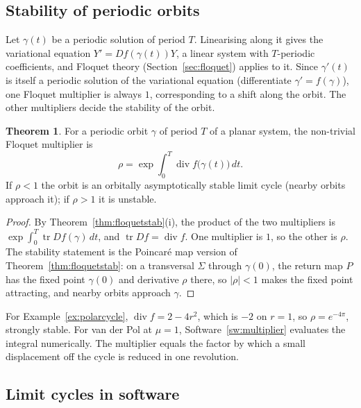\documentclass[11pt,a4paper]{article}
\numberwithin{equation}{section}
\DeclareMathOperator{\tr}{tr}
\theoremstyle{definition}
\newtheorem{thm}{Theorem}[subsection]
\begin{document}
\subsection{Stability of periodic orbits}
\label{ssec:orbitstab}

Let $\gamma(t)$ be a periodic solution of period $T$. Linearising along it gives the variational equation $Y' = Df(\gamma(t))Y$, a linear system with $T$-periodic coefficients, and Floquet theory
(Section~\ref{sec:floquet}) applies to it. Since $\gamma'(t)$ is itself a periodic solution of the variational equation (differentiate $\gamma' = f(\gamma)$), one Floquet multiplier is always $1$, corresponding
to a shift along the orbit. The other multipliers decide the stability of the orbit.

\begin{thm}
\label{thm:cyclestab}
For a periodic orbit $\gamma$ of period $T$ of a planar system, the non-trivial Floquet multiplier is
\[
\rho = \exp\int_0^T\operatorname{div}f\bigl(\gamma(t)\bigr)\,dt .
\]
If $\rho < 1$ the orbit is an orbitally asymptotically stable limit cycle (nearby orbits approach it); if $\rho > 1$ it is unstable.
\end{thm}

\begin{proof}
By Theorem~\ref{thm:floquetstab}(i), the product of the two multipliers is $\exp\int_0^T\tr Df(\gamma)\,dt$, and $\tr Df = \operatorname{div}f$. One multiplier is $1$, so the other is $\rho$. The stability statement is
the Poincar\'e map version of Theorem~\ref{thm:floquetstab}: on a transversal $\Sigma$ through $\gamma(0)$, the return map $P$ has the fixed point $\gamma(0)$ and derivative $\rho$ there, so $|\rho| < 1$ makes the fixed point
attracting, and nearby orbits approach $\gamma$.
\end{proof}

For Example~\ref{ex:polarcycle}, $\operatorname{div}f = 2 - 4r^2$, which is $-2$ on $r = 1$, so $\rho = e^{-4\pi}$, strongly stable. For van der Pol at $\mu = 1$, Software~\ref{sw:multiplier} evaluates the integral numerically. The
multiplier equals the factor by which a small displacement off the cycle is reduced in one revolution.

\subsection{Limit cycles in software}
\label{ssec:software12}
\end{document}
